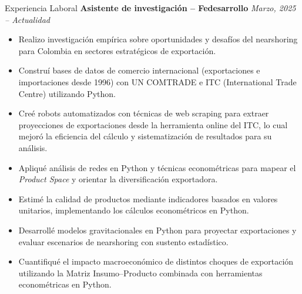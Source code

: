 \documentclass{resume}
\begin{document}
\begin{rSection}{Experiencia Laboral}
{\bf Asistente de investigación – Fedesarrollo} \hfill {\em Marzo, 2025 – Actualidad}
\begin{itemize}
    \item Realizo investigación empírica sobre oportunidades y desafíos del nearshoring para Colombia en sectores estratégicos de exportación.
    \item Construí bases de datos de comercio internacional (exportaciones e importaciones desde 1996) con UN COMTRADE e ITC (International Trade Centre) utilizando Python.
    \item Creé robots automatizados con técnicas de web scraping para extraer proyecciones de exportaciones desde la herramienta online del ITC, lo cual mejoró la eficiencia del cálculo y sistematización de resultados para su análisis.
    \item Apliqué análisis de redes en Python y técnicas econométricas para mapear el \textit{Product Space} y orientar la diversificación exportadora.
    \item Estimé la calidad  de productos mediante indicadores basados en valores unitarios, implementando los cálculos econométricos en Python.
    \item Desarrollé modelos gravitacionales en Python para proyectar exportaciones y evaluar escenarios de nearshoring con sustento estadístico.
    \item Cuantifiqué el impacto macroeconómico de distintos choques de exportación utilizando la Matriz Insumo--Producto combinada con herramientas econométricas en Python.
\end{itemize}


\end{rSection}
\end{document}
